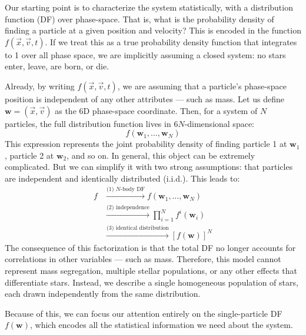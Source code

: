         Our starting point is to characterize the system statistically, with a distribution function (DF) over phase-space. That is, what is the probability density of finding a particle at a given position and velocity? This is encoded in the function \( f(\vec{x}, \vec{v}, t) \). If we treat this as a true probability density function that integrates to 1 over all phase space, we are implicitly assuming a closed system: no stars enter, leave, are born, or die.

        Already, by writing \( f(\vec{x}, \vec{v}, t) \), we are assuming that a particle's phase-space position is independent of any other attributes — such as mass. Let us define \( \mathbf{w} = (\vec{x}, \vec{v}) \) as the 6D phase-space coordinate. Then, for a system of \( N \) particles, the full distribution function lives in \(6N\)-dimensional space:  
        \[
        f(\mathbf{w}_1, \dots, \mathbf{w}_N)
        \]  
        This expression represents the joint probability density of finding particle 1 at \( \mathbf{w}_1 \), particle 2 at \( \mathbf{w}_2 \), and so on. In general, this object can be extremely complicated. But we can simplify it with two strong assumptions: that particles are independent and identically distributed (i.i.d.). This leads to:
        \[
        \begin{array}{rl}
        f 
        & \stackrel{\text{(1) $N$-body DF}}{\longrightarrow} 
        f(\mathbf{w}_1, \dots, \mathbf{w}_N) \\[2ex]
        & \stackrel{\text{(2) independence}}{\longrightarrow} 
        \prod_{i=1}^N f^i(\mathbf{w}_i) \\[2ex]
        & \stackrel{\text{(3) identical distribution}}{\longrightarrow} 
        \left[ f(\mathbf{w}) \right]^N
        \end{array}
        \]
        The consequence of this factorization is that the total DF no longer accounts for correlations in other variables — such as mass. Therefore, this model cannot represent mass segregation, multiple stellar populations, or any other effects that differentiate stars. Instead, we describe a single homogeneous population of stars, each drawn independently from the same distribution.

        Because of this, we can focus our attention entirely on the single-particle DF \( f(\mathbf{w}) \), which encodes all the statistical information we need about the system.

